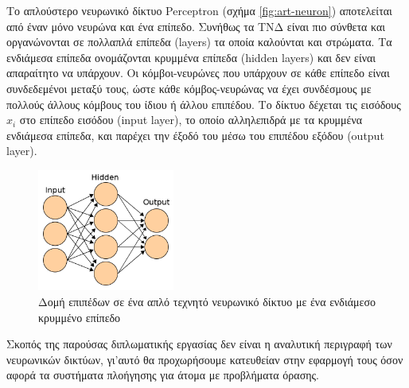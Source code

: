 Το απλούστερο νευρωνικό δίκτυο Perceptron \cite{rosenblatt1961principles} (σχήμα \ref{fig:art-neuron}) αποτελείται από έναν μόνο νευρώνα και ένα επίπεδο. Συνήθως τα ΤΝΔ είναι πιο σύνθετα και οργανώνονται σε πολλαπλά επίπεδα (layers) τα οποία καλούνται και στρώματα. Τα ενδιάμεσα επίπεδα ονομάζονται κρυμμένα επίπεδα (hidden layers) και δεν είναι απαραίτητο να υπάρχουν. Οι κόμβοι-νευρώνες που υπάρχουν σε κάθε επίπεδο είναι συνδεδεμένοι μεταξύ τους, ώστε κάθε κόμβος-νευρώνας να έχει συνδέσμους με πολλούς άλλους κόμβους του ίδιου ή άλλου επιπέδου. Το δίκτυο δέχεται τις εισόδους $x_i$ στο επίπεδο εισόδου (input layer), το οποίο αλληλεπιδρά με τα κρυμμένα ενδιάμεσα επίπεδα, και παρέχει την έξοδό του μέσω του επιπέδου εξόδου (output layer).

\begin{figure}[H]
    \centering
    \includegraphics[width=0.4\textwidth]{images/ann_layers.png}
    \caption{Δομή επιπέδων σε ένα απλό τεχνητό νευρωνικό δίκτυο με ένα ενδιάμεσο κρυμμένο επίπεδο}
    \label{fig:ann-layers}
\end{figure}

Σκοπός της παρούσας διπλωματικής εργασίας δεν είναι η αναλυτική περιγραφή των νευρωνικών δικτύων, γι'αυτό θα προχωρήσουμε κατευθείαν στην εφαρμογή τους όσον αφορά τα συστήματα πλοήγησης για άτομα με προβλήματα όρασης.

